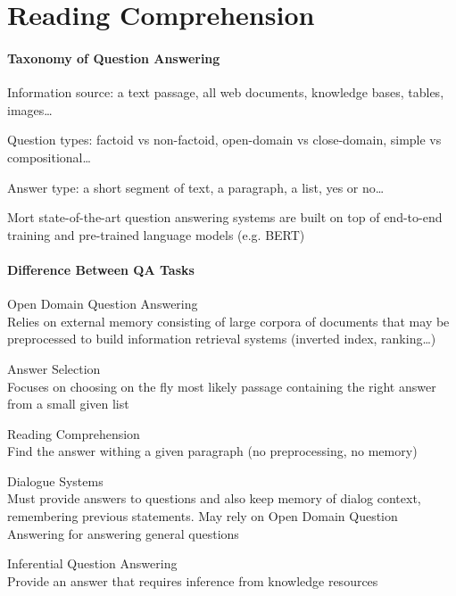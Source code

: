 \documentclass[10pt]{report}
\begin{document}
\section{Reading Comprehension}
\paragraph{Taxonomy of Question Answering}
\begin{list}{}{}
	\item Information source: a text passage, all web documents, knowledge bases, tables, images\ldots
	\item Question types: factoid vs non-factoid, open-domain vs close-domain, simple vs compositional\ldots
	\item Answer type: a short segment of text, a paragraph, a list, yes or no\ldots
\end{list}
Mort state-of-the-art question answering systems are built on top of end-to-end training and pre-trained language models (e.g. BERT)
\paragraph{Difference Between QA Tasks}
\begin{list}{}{}
	\item Open Domain Question Answering\\
	Relies on external memory consisting of large corpora of documents that may be preprocessed to build information retrieval systems (inverted index, ranking\ldots)
	\item Answer Selection\\
	Focuses on choosing on the fly most likely passage containing the right answer from a small given list
	\item Reading Comprehension\\
	Find the answer withing a given paragraph (no preprocessing, no memory)
	\item Dialogue Systems\\
	Must provide answers to questions and also keep memory of dialog context, remembering previous statements. May rely on Open Domain Question Answering for answering general questions
	\item Inferential Question Answering\\
	Provide an answer that requires inference from knowledge resources
\end{list}
\end{document}
